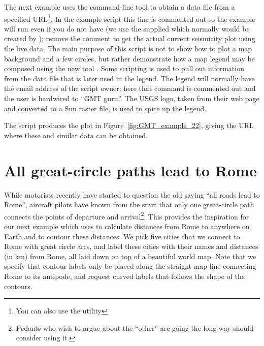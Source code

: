 The next example uses the command-line tool  to obtain a data file
from a specified URL\footnote{You can also use the utility }.
In the example script this line is commented out so the
example will run even if you do not have  (we use the supplied
 which normally would be created by ); remove the comment to
get the actual current seismicity plot using the live data.  The main purpose of
this script is not to show how to plot a map background and a few circles, but
rather demonstrate how a map legend may be composed using the new tool .
Some scripting is used to pull out information from the data file that is later
used in the legend.  The legend will normally have the email address of the script
owner; here that command is commented out and the user is hardwired to ``GMT guru''.
The USGS logo, taken from their web page and converted to a Sun raster file, is used
to spice up the legend.


The script produces the plot in Figure~\ref{fig:GMT_example_22}, giving the URL
where these and similar data can be obtained.


\section{All great-circle paths lead to Rome}

While motorists recently have started to question the old saying ``all roads lead to Rome'',
aircraft pilots have known from the start that only one great-circle path connects the
points of departure and arrival\footnote{Pedants who wish to argue about the ``other''
arc going the long way should consider using it.}.  This provides the inspiration for our next
example which uses  to calculate distances from Rome to anywhere on
Earth and  to contour these distances.  We pick five cities that
we connect to Rome with great circle arcs, and label these cities with their names and
distances (in km) from Rome, all laid down on top of a beautiful world map.  Note that
we specify that contour labels only be placed along the straight map-line connecting
Rome to its antipode, and request curved labels that follows the shape of the contours.

